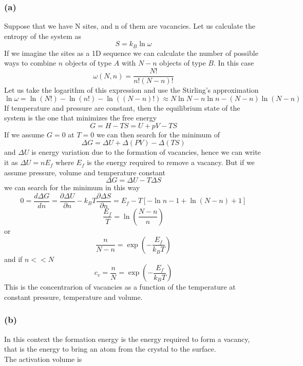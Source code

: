 \subsubsection*{(a)}
Suppose that we have N sites, and n of them are vacancies. Let us calculate the entropy of the system as
$$S = k_B \ln\omega$$
If we imagine the sites as a 1D sequence we can calculate the number of possible ways to 
combine $n$ objects of type $A$ with $N-n$ objects of type $B$. In this case
$$\omega(N, n) = \frac{N!}{n!(N-n)!}$$
Let us take the logarithm of this expression and use the Stirling's approximation
$$\ln \omega = \ln(N!) - \ln(n!) - \ln((N-n)!) \approx N \ln N - n \ln n - (N-n)\ln(N-n)$$
If temperature and pressure are constant, then the equilibrium state of the system is the one that minimizes the free energy
$$G = H - TS = U + pV - TS$$
If we assume $G=0$ at $T=0$ we can then search for the minimum of 
$$\Delta G = \Delta U + \Delta(PV) - \Delta(TS)$$ and $\Delta U$ is energy variation due to the formation of vacancies, hence
we can write it as $\Delta U = nE_f$ where $E_f$ is the energy required to remove a vacancy. But if we assume pressure, volume and temperature constant
$$\Delta G = \Delta U - T\Delta S$$ 
we can search for the minimum in this way 
$$ 0 = \frac{d \Delta G}{dn} = \frac{\partial \Delta U}{\partial n} - k_BT\frac{\partial \Delta S}{\partial n} = 
E_f - T\left[-\ln n - 1 + \ln (N-n) + 1 \right]$$
$$\frac{E_f}{T} = \ln\left(\frac{N-n}{n}\right)$$
or
$$\frac{n}{N-n} = \exp\left(-\frac{E_f}{k_B T}\right)$$
and if $n << N$
$$c_v = \frac{n}{N} = \exp\left(-\frac{E_f}{k_B T}\right)$$
This is the concentrarion of vacancies as a function of the temperature at constant pressure, temperature and volume.
\newpage
\subsubsection*{(b)}
In this context the formation energy is the energy required to form a vacancy, that is the energy to bring an atom from the crystal to the surface. \\
The activation volume is 
